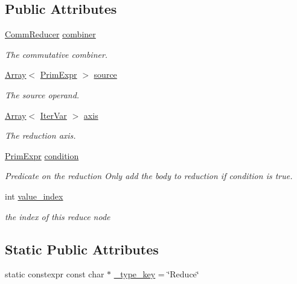 \subsection*{Public Attributes}
\begin{DoxyCompactItemize}
\item 
\hyperlink{classtvm_1_1tir_1_1CommReducer}{Comm\+Reducer} \hyperlink{classtvm_1_1tir_1_1ReduceNode_a5dcdd28aac37f4313ad18065bf824e11}{combiner}
\begin{DoxyCompactList}\small\item\em The commutative combiner. \end{DoxyCompactList}\item 
\hyperlink{classtvm_1_1Array}{Array}$<$ \hyperlink{classtvm_1_1PrimExpr}{Prim\+Expr} $>$ \hyperlink{classtvm_1_1tir_1_1ReduceNode_ab1b5e256aabba3307ccfeb291bb58771}{source}
\begin{DoxyCompactList}\small\item\em The source operand. \end{DoxyCompactList}\item 
\hyperlink{classtvm_1_1Array}{Array}$<$ \hyperlink{classtvm_1_1tir_1_1IterVar}{Iter\+Var} $>$ \hyperlink{classtvm_1_1tir_1_1ReduceNode_a570320077ad05834027c4eae1c228e00}{axis}
\begin{DoxyCompactList}\small\item\em The reduction axis. \end{DoxyCompactList}\item 
\hyperlink{classtvm_1_1PrimExpr}{Prim\+Expr} \hyperlink{classtvm_1_1tir_1_1ReduceNode_acd7c0d18b8b1cc78203479dfd52cd94c}{condition}
\begin{DoxyCompactList}\small\item\em Predicate on the reduction Only add the body to reduction if condition is true. \end{DoxyCompactList}\item 
int \hyperlink{classtvm_1_1tir_1_1ReduceNode_a3e27c310483199b33784b1b98e3787af}{value\+\_\+index}
\begin{DoxyCompactList}\small\item\em the index of this reduce node \end{DoxyCompactList}\end{DoxyCompactItemize}
\subsection*{Static Public Attributes}
\begin{DoxyCompactItemize}
\item 
static constexpr const char $\ast$ \hyperlink{classtvm_1_1tir_1_1ReduceNode_a48d7c59bdf820c1a5bbafbf0f3cdb4eb}{\+\_\+type\+\_\+key} = \char`\"{}Reduce\char`\"{}
\end{DoxyCompactItemize}


